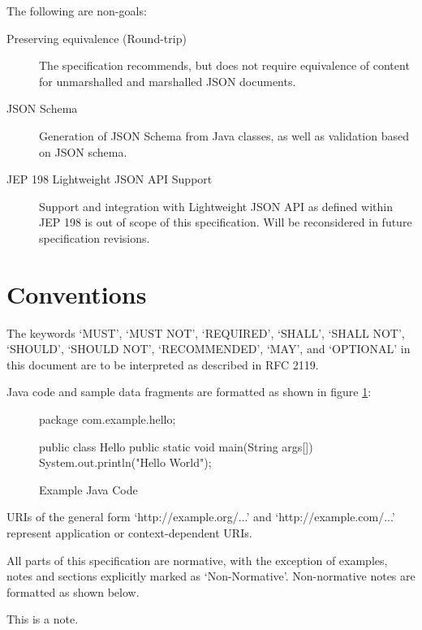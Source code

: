 The following are non-goals:

\begin{description}

\item[Preserving equivalence (Round-trip)] The specification recommends, but does not require equivalence of content for unmarshalled and marshalled JSON documents.

\item[JSON Schema] Generation of JSON Schema from Java classes, as well as validation based on JSON schema.

\item[JEP 198 Lightweight JSON API Support] Support and integration with Lightweight JSON API as defined within JEP 198 is out of scope of this specification. Will be reconsidered in future specification revisions.

\end{description}

\section{Conventions}

The keywords `MUST', `MUST NOT', `REQUIRED', `SHALL', `SHALL NOT', `SHOULD', `SHOULD NOT', `RECOMMENDED', `MAY', and `OPTIONAL' in this document are to be interpreted as described in RFC 2119\cite{rfc2119}. 

Java code and sample data fragments are formatted as shown in figure \ref{ex1}:

\begin{figure}[hbtp]
\caption{Example Java Code}
\label{ex1}
\begin{listing}{1}
package com.example.hello;

public class Hello {
    public static void main(String args[]) {
        System.out.println("Hello World");
    }
}\end{listing}
\end{figure}

URIs of the general form `http://example.org/...' and `http://example.com/...' represent application or context-dependent URIs.

All parts of this specification are normative, with the exception of examples, notes and sections explicitly marked as `Non-Normative'. Non-normative notes are formatted as shown below.

\begin{nnnote*}
This is a note.
\end{nnnote*}

